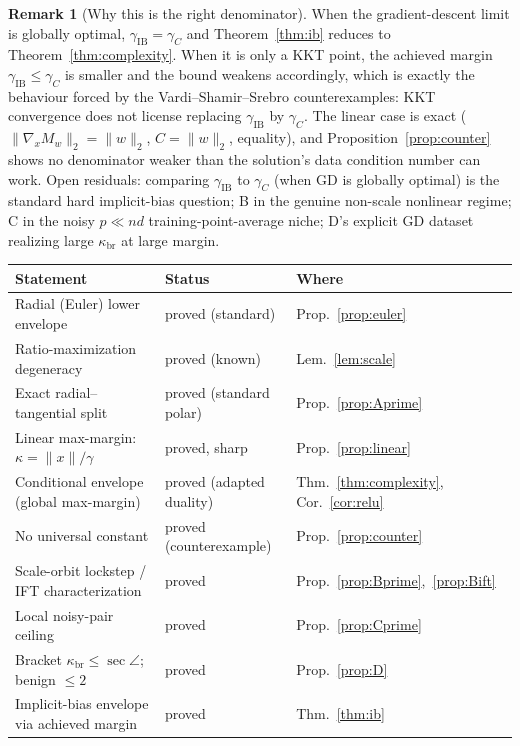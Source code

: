 \documentclass[11pt]{article}
\theoremstyle{definition}
\newtheorem{remark}{Remark}
\newcommand{\dd}{d}
\newcommand{\grad}{\nabla}
\begin{document}
\begin{remark}[Why this is the right denominator]
When the gradient-descent limit is globally optimal, $\gamma_{\mathrm{IB}}=\gamma_C$ and
Theorem~\ref{thm:ib} reduces to Theorem~\ref{thm:complexity}. When it is only a KKT
point, the achieved margin $\gamma_{\mathrm{IB}}\le\gamma_C$ is smaller and the bound
weakens accordingly, which is exactly the behaviour forced by the Vardi--Shamir--Srebro
counterexamples: KKT convergence does not license replacing $\gamma_{\mathrm{IB}}$ by
$\gamma_C$. The linear case is exact ($\|\grad_xM_w\|_2=\|w\|_2$, $C=\|w\|_2$, equality),
and Proposition~\ref{prop:counter} shows no denominator weaker than the
solution's data condition number can work. Open residuals: comparing
$\gamma_{\mathrm{IB}}$ to $\gamma_C$ (when GD is globally optimal) is the standard hard
implicit-bias question; B in the genuine non-scale nonlinear regime; C in the noisy
$p\ll n\dd$ training-point-average niche; D's explicit GD dataset realizing large
$\kappa_{\mathrm{br}}$ at large margin.
\end{remark}

\begin{center}
\begin{tabular}{lll}
\hline
Statement & Status & Where \\
\hline
Radial (Euler) lower envelope & proved (standard) & Prop.~\ref{prop:euler} \\
Ratio-maximization degeneracy & proved (known) & Lem.~\ref{lem:scale} \\
Exact radial--tangential split & proved (standard polar) & Prop.~\ref{prop:Aprime} \\
Linear max-margin: $\kappa=\|x\|/\gamma$ & proved, sharp & Prop.~\ref{prop:linear} \\
Conditional envelope (global max-margin) & proved (adapted duality) & Thm.~\ref{thm:complexity}, Cor.~\ref{cor:relu} \\
No universal constant & proved (counterexample) & Prop.~\ref{prop:counter} \\
Scale-orbit lockstep / IFT characterization & proved & Prop.~\ref{prop:Bprime},~\ref{prop:Bift} \\
Local noisy-pair ceiling & proved & Prop.~\ref{prop:Cprime} \\
Bracket $\kappa_{\mathrm{br}}\le\sec\angle$; benign $\le2$ & proved & Prop.~\ref{prop:D} \\
Implicit-bias envelope via achieved margin & proved & Thm.~\ref{thm:ib} \\
\hline
\end{tabular}
\end{center}
\end{document}
